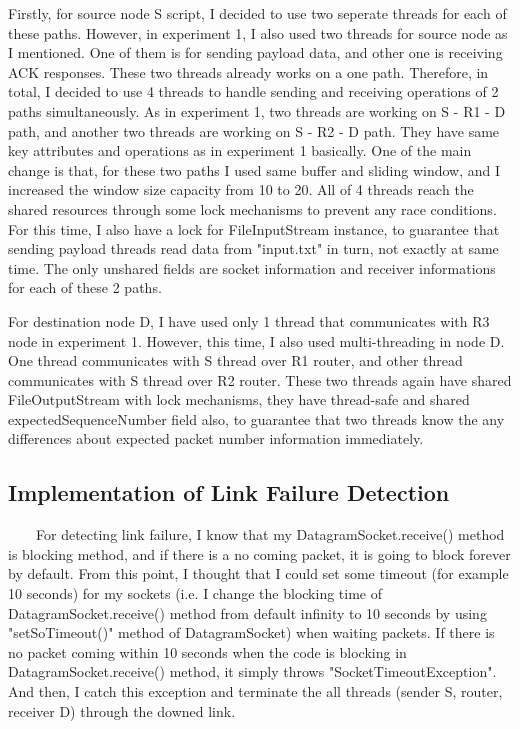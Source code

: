 \documentclass[12pt]{article}
\begin{document}
Firstly, for source node S script, I decided to use two seperate threads for each of these paths. However, in experiment 1, I also used two threads for source node as I mentioned. One of them is for sending payload data, and other one is receiving ACK responses. These two threads already works on a one path. Therefore, in total, I decided to use 4 threads to handle sending and receiving operations of 2 paths simultaneously. As in experiment 1, two threads are working on S - R1 - D path, and another two threads are working on S - R2 - D path. They have same key attributes and operations as in experiment 1 basically. One of the main change is that, for these two paths I used same buffer and sliding window, and I increased the window size capacity from 10 to 20. All of 4 threads reach the shared resources through some lock mechanisms to prevent any race conditions. For this time, I also have a lock for FileInputStream instance, to guarantee that sending payload threads read data from "input.txt" in turn, not exactly at same time. The only unshared fields are socket information and receiver informations for each of these 2 paths.

For destination node D, I have used only 1 thread that communicates with R3 node in experiment 1. However, this time, I also used multi-threading in node D. One thread communicates with S thread over R1 router, and other thread communicates with S thread over R2 router. These two threads again have shared FileOutputStream with lock mechanisms, they have thread-safe and shared expectedSequenceNumber field also, to guarantee that two threads know the any differences about expected packet number information immediately.   


\subsection{Implementation of Link Failure Detection}
\ \ \ \ For detecting link failure, I know that my DatagramSocket.receive() method is blocking method, and if there is a no coming packet, it is going to block forever by default. From this point, I thought that I could set some timeout (for example 10 seconds) for my sockets (i.e. I change the blocking time of DatagramSocket.receive() method from default infinity to 10 seconds by using "setSoTimeout()" method of DatagramSocket) when waiting packets. If there is no packet coming within 10 seconds when the code is blocking in DatagramSocket.receive() method, it simply throws "SocketTimeoutException". And then, I catch this exception and terminate the all threads (sender S, router, receiver D) through the downed link.
\end{document}
